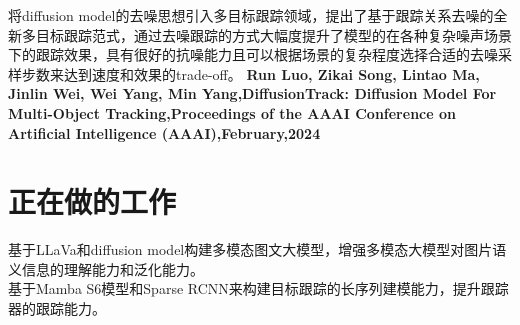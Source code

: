 \documentclass{uniquecv}
\begin{document}
将diffusion model的去噪思想引入多目标跟踪领域，提出了基于跟踪关系去噪的全新多目标跟踪范式，通过去噪跟踪的方式大幅度提升了模型的在各种复杂噪声场景下的跟踪效果，具有很好的抗噪能力且可以根据场景的复杂程度选择合适的去噪采样步数来达到速度和效果的trade-off。
\textbf{Run Luo, Zikai Song, Lintao Ma, Jinlin Wei, Wei Yang, Min Yang,DiffusionTrack: Diffusion Model For Multi-Object Tracking,Proceedings of the AAAI Conference on Artificial Intelligence (AAAI),February,2024}
\vspace{0.4ex}

\section{正在做的工作}

基于LLaVa和diffusion model构建多模态图文大模型，增强多模态大模型对图片语义信息的理解能力和泛化能力。
\vspace{0.4ex}
\\
基于Mamba S6模型和Sparse RCNN来构建目标跟踪的长序列建模能力，提升跟踪器的跟踪能力。

\end{document}
